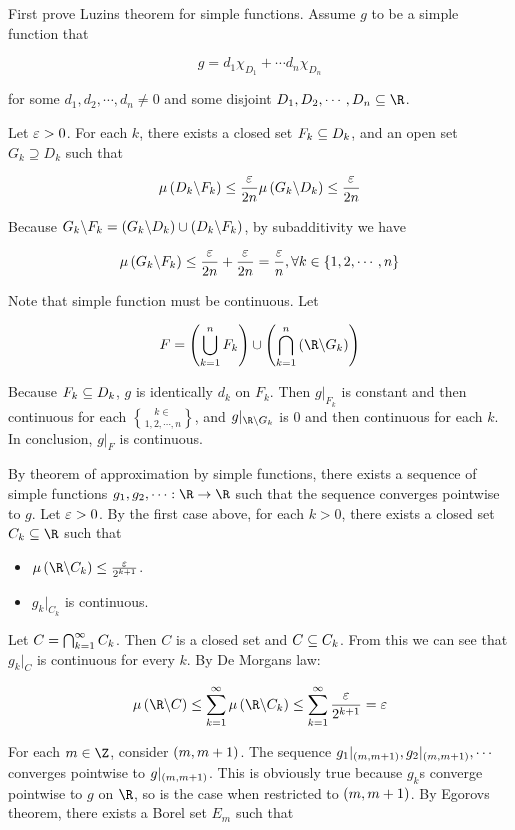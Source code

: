 \documentclass[
]{article}
\begin{document}
First prove Luzin\textquotesingle s theorem for simple functions. Assume
\(g\) to be a simple function that

\[g = d_1\chi_{D_1}+\cdots d_n\chi_{D_n}\]

for some \(d_1,d_2,\cdots,d_n\ne 0\) and some disjoint
\(D_1,D_2,\cdots,D_n\se \R\).

Let \(\varepsilon>0\). For each \(k\), there exists a closed set \(F_k\subseteq D_k\),
and an open set \(G_k\supseteq D_k\) such that

\[\mu\left(D_k\backslash F_k\right)\le\frac{\varepsilon}{2n}\\
\mu\left(G_k\backslash D_k\right)\le\frac{\varepsilon}{2n}\]

Because \(G_k\backslash F_k = \left(G_k\backslash D_k\right)\cup \left(D_k\backslash F_k\right)\), by
subadditivity we have

\[\mu\left(G_k\backslash F_k\right)\le \frac{\varepsilon}{2n}+ \frac{\varepsilon}{2n}= \frac{\varepsilon}{n},\forall k\in \left\{1,2,\cdots,n\right\}\]

Note that simple function must be continuous. Let

\[F = \pr{\bigcup_{k = 1}^nF_k}\cup \pr{\bigcap_{k = 1}^n\pr{\R\c G_k}}\]

Because \(F_k\subseteq D_k\), \(g\) is identically \(d_k\) on \(F_k\). Then
\(g|_{F_k}\) is constant and then continuous for each
\(k\in \brace{1,2,\cdots,n}\), and \(g|_{\R\c G_k}\) is \(0\) and then
continuous for each \(k\). In conclusion, \(g|_F\) is continuous.

By theorem of approximation by simple functions, there exists a sequence
of simple functions \(g_1,g_2,\cdots:\R\to \R\) such that the sequence
converges pointwise to \(g\). Let \(\varepsilon>0\). By the first case above,
for each \(k>0\), there exists a closed set \(C_k\se \R\) such that

\begin{itemize}
\item
  \(\lm{\R\c C_k}\le \frac{\ve}{2^{k+1}}\).
\item
  \(g_k|_{C_k}\) is continuous.
\end{itemize}

Let \(C = \bigcap_{{k} = 1}^{\infty} C_k\). Then \(C\) is a closed set and \(C\subseteq C_k\). From
this we can see that \(g_k|_C\) is continuous for every \(k\). By De
Morgan\textquotesingle s law:

\[\lm{\R\c C}\le \sinf\lm{\R\c C_k}\le \sinf \frac{\ve}{2^{k+1}} = \ve\]

For each \(m\in \Z\), consider \(\left(m,m+1\right)\). The sequence
\(g_1|_{\left(m,m+1\right)},g_2|_{\left(m,m+1\right)},\cdots\) converges pointwise to
\(g|_{\left(m,m+1\right)}\). This is obviously true because
\(g_k\)\textquotesingle s converge pointwise to \(g\) on \(\R\), so is
the case when restricted to \(\left(m,m+1\right)\). By Egorov\textquotesingle s
theorem, there exists a Borel set \(E_m\) such that
\end{document}

